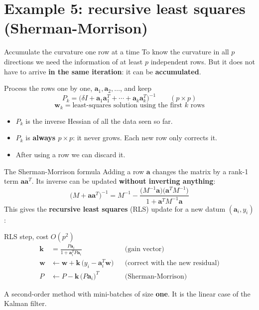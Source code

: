 \documentclass[10pt,aspectratio=169]{beamer}
\newcommand{\hl}[1]{\textcolor{accent}{\textbf{#1}}}
\begin{document}
\section{Example 5: recursive least squares (Sherman-Morrison)}

\begin{frame}{Accumulate the curvature one row at a time}
  To know the curvature in all $p$ directions we need the information of at
  least $p$ independent rows. But it does not have to arrive \hl{in the
  same iteration}: it can be \hl{accumulated}.
  \vspace{0.5em}

  Process the rows one by one, $\bm{a}_1, \bm{a}_2, \dots$, and keep
  \[
    P_k = \big(\delta I + \bm{a}_1\bm{a}_1^T + \cdots + \bm{a}_k\bm{a}_k^T\big)^{-1}
    \qquad (p\times p)
  \]
  \[
    \bm{w}_k = \text{least-squares solution using the first } k \text{ rows}
  \]
  \begin{itemize}
    \item $P_k$ is the inverse Hessian of all the data seen so far.
    \item $P_k$ is \hl{always $p\times p$}: it never grows. Each new row only
          corrects it.
    \item After using a row we can discard it.
  \end{itemize}
\end{frame}

\begin{frame}{The Sherman-Morrison formula}
  Adding a row $\bm{a}$ changes the matrix by a rank-1 term $\bm{a}\bm{a}^T$.
  Its inverse can be updated \hl{without inverting anything}:
  \[
    \big(M + \bm{a}\bm{a}^T\big)^{-1}
    = M^{-1} - \frac{\big(M^{-1}\bm{a}\big)\big(\bm{a}^TM^{-1}\big)}
                    {1 + \bm{a}^TM^{-1}\bm{a}}
  \]
  This gives the \hl{recursive least squares} (RLS) update for a new datum
  $(\bm{a}_i, y_i)$:
  \begin{block}{RLS step, cost $O(p^2)$}
    \vspace{-0.8em}
    \begin{align*}
      \bm{k} &= \frac{P\bm{a}_i}{1 + \bm{a}_i^TP\bm{a}_i}
             && \text{(gain vector)} \\
      \bm{w} &\leftarrow \bm{w} + \bm{k}\,\big(y_i - \bm{a}_i^T\bm{w}\big)
             && \text{(correct with the new residual)} \\
      P &\leftarrow P - \bm{k}\,\big(P\bm{a}_i\big)^T
             && \text{(Sherman-Morrison)}
    \end{align*}
  \end{block}
  A second-order method with mini-batches of size \hl{one}. It is the linear
  case of the Kalman filter.
\end{frame}
\end{document}
